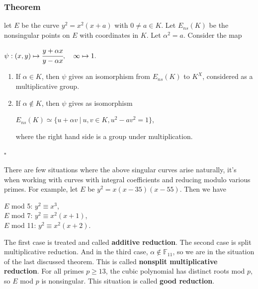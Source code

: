 \documentclass[a4paper, 12pt]{article}
\begin{document}
\subsubsection{Theorem}
let $E$ be the curve $y^2=x^2(x+a)$ with $0 \neq a \in K$. Let $E_{ns}(K)$ be the nonsingular points on $E$ with coordinates in $K$. Let $\alpha^2 = a$. Consider the map
\begin{center}
$\psi:(x,y) \mapsto \cfrac{y+\alpha x}{y - \alpha x}, \quad \infty \mapsto 1.$
\end{center}
\begin{enumerate}
	\item If $\alpha \in K$, then $\psi$ gives an isomorphism from $E_{ns}(K)$ to $K^X$, considered as a multiplicative group.
	\item If $\alpha \notin K$, then $\psi$ gives as isomorphism
	\begin{center} $E_{ns}(K) \simeq \{u + \alpha v \:|\: u,v \in K, u^2 - av^2 = 1\}$, \end{center}
	where the right hand side is a group under multiplication.
\end{enumerate}
$\square$ \par
There are few situations where the above singular curves arise naturally, it's when working with curves with integral coefficients and reducing modulo various primes. For example, let $E$ be $y^2=x(x-35)(x-55)$. Then we have 
\begin{center}
$E$ mod 5: $y^2 \equiv x^3$, \\
$E$ mod 7: $y^2 \equiv x^2(x+1)$, \\
$E$ mod 11: $y^2 \equiv x^2(x+2)$.
\end{center}
The first case is treated and called \textbf{additive reduction}. The second case is split multiplicative reduction. 
And in the third case, $\alpha \notin \mathbb{F}_{11}$, so we are in the situation of the last discussed theorem. This is called \textbf{nonsplit multiplicative reduction}. 
For all primes $p \geq 13$, the cubic polynomial has distinct roots mod $p$, so $E$ mod $p$ is nonsingular. This situation is called \textbf{good reduction}.
\end{document}
